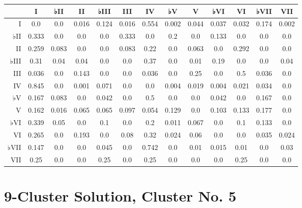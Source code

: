 \begin{table}[htbp]
\begin{minipage}{\linewidth}
\setlength{\tymax}{0.5\linewidth}
\centering
\small
\begin{tabulary}{\textwidth}{@{}RCCCCCCCCCCCC@{}} \toprule
&I&♭II&II&♭III&III&IV&♭V&V&♭VI&VI&♭VII&VII\\
\midrule
I&0.0&0.0&0.016&0.124&0.016&0.554&0.002&0.044&0.037&0.032&0.174&0.002\\
♭II&0.333&0.0&0.0&0.0&0.333&0.0&0.2&0.0&0.133&0.0&0.0&0.0\\
II&0.259&0.083&0.0&0.0&0.083&0.22&0.0&0.063&0.0&0.292&0.0&0.0\\
♭III&0.31&0.04&0.04&0.0&0.0&0.37&0.0&0.01&0.19&0.0&0.0&0.04\\
III&0.036&0.0&0.143&0.0&0.0&0.036&0.0&0.25&0.0&0.5&0.036&0.0\\
IV&0.845&0.0&0.001&0.071&0.0&0.0&0.004&0.019&0.004&0.021&0.034&0.0\\
♭V&0.167&0.083&0.0&0.042&0.0&0.5&0.0&0.0&0.042&0.0&0.167&0.0\\
V&0.162&0.016&0.065&0.065&0.097&0.054&0.129&0.0&0.103&0.133&0.177&0.0\\
♭VI&0.339&0.05&0.0&0.1&0.0&0.2&0.011&0.067&0.0&0.1&0.133&0.0\\
VI&0.265&0.0&0.193&0.0&0.08&0.32&0.024&0.06&0.0&0.0&0.035&0.024\\
♭VII&0.147&0.0&0.0&0.045&0.0&0.742&0.0&0.01&0.015&0.01&0.0&0.03\\
VII&0.25&0.0&0.0&0.25&0.0&0.25&0.0&0.0&0.0&0.25&0.0&0.0\\

\bottomrule

\end{tabulary}
\end{minipage}
\end{table}

\section{9-Cluster Solution, Cluster No. 5}
\label{9-clustersolutionclusterno.5}

